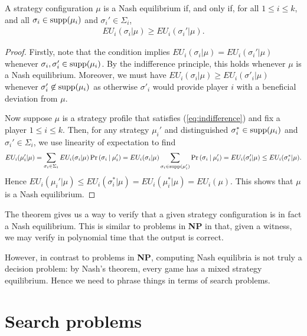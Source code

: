 \documentclass{article}
\begin{document}
\begin{theorem}\label{thm:indifference}
  A strategy configuration $\mu$ is a
  Nash equilibrium if, and only if, for all $1\leq i\leq k$,
  and all $\sigma_i\in\operatorname*{supp}(\mu_i)$ and $\sigma_i'\in\Sigma_i$,
  \begin{align}\label{eq:indifference}
    EU_i(\sigma_i | \mu) \geq EU_i(\sigma_i' | \mu).
  \end{align}
  \begin{proof}
    Firstly, note that the condition implies $EU_i(\sigma_i|\mu)=EU_i(\sigma_i'|\mu)$ whenever $\sigma_i,\sigma_i'\in\operatorname*{supp}(\mu_i)$. By the
    indifference principle, this holds whenever $\mu$ is a Nash
    equilibrium. Moreover, we must have $EU_i(\sigma_i|\mu)\geq EU_i(\sigma'_i|\mu)$ whenever $\sigma'_i\not\in\operatorname*{supp}(\mu_i)$ as otherwise
    $\sigma'_i$ would provide player $i$ with a beneficial deviation
    from $\mu$.

    Now suppose $\mu$ is a strategy profile that satisfies (\ref{eq:indifference}) and fix a player $1\leq i\leq k$.
    Then, for any strategy $\mu_i'$ and distinguished
    $\sigma_i^*\in\operatorname*{supp}(\mu_i)$ and $\sigma_i'\in\Sigma_i$, we use linearity
    of expectation to find
    \begin{align*}
      EU_i(\mu_i' | \mu)
      = \sum_{\sigma_i\in\Sigma_i} EU_i (\sigma_i|\mu)\Pr\left({{\sigma_i}\:|\:\mu_i'}\right)
      = EU_i (\sigma_i|\mu) \sum_{\sigma_i\in\operatorname*{supp}(\mu'_i)} \Pr\left({{\sigma_i}\:|\:\mu_i'}\right)
      = EU_i (\sigma_i'|\mu)
      \leq EU_i (\sigma_i^*|\mu).
    \end{align*}
    Hence $EU_i(\mu_i' | \mu) \leq EU_i(\sigma^*_i | \mu) = EU_i(\mu^*_i | \mu) =
    EU_i(\mu)$. This shows that $\mu$ is a Nash equilibrium.
  \end{proof}
\end{theorem}

The theorem gives us a way to verify that a given strategy configuration is in fact a Nash equilibrium. This is similar to problems in \textbf{NP}
in that, given a witness, we may verify in polynomial time that the
output is correct.

However, in contrast to problems in \textbf{NP}, computing Nash
equilibria is not truly a decision problem: by Nash's theorem, every
game has a mixed strategy equilibrium. Hence we need to phrase
things in terms of search problems.

\section{Search problems}
\end{document}
